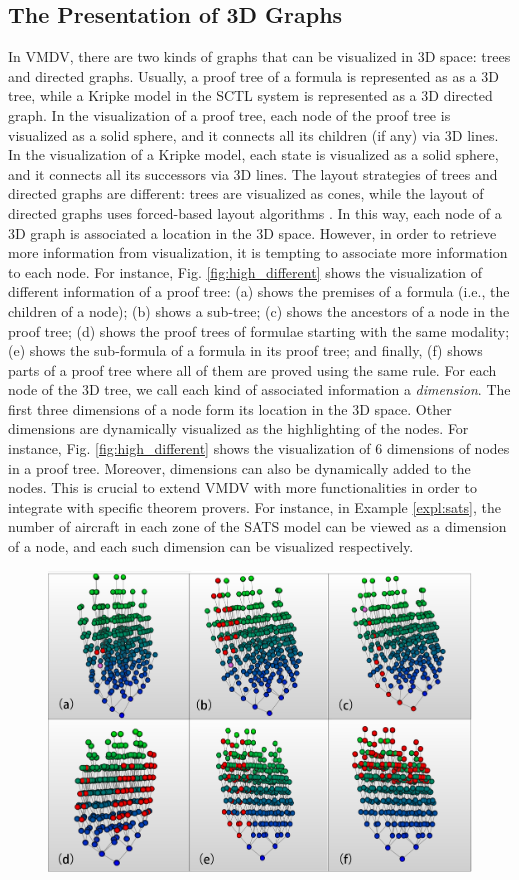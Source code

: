 \documentclass[runningheads]{llncs}
\newcommand\tool[1]{\textsf{#1}}
\begin{document}
{\color{red}

\subsection{\bf The Presentation of 3D Graphs}
In \tool{VMDV}, there are two kinds of graphs that can be visualized in 3D space: trees and directed graphs. Usually, a proof tree of a formula is represented as as a 3D tree, while a Kripke model in the \textsf{SCTL} system is represented as a 3D directed graph.
In the visualization of a proof tree, each node of the proof tree is visualized as a solid sphere, and it connects all its children (if any) via 3D lines. In the visualization of a Kripke model, each state is visualized as a solid sphere, and it connects all its successors via 3D lines. The layout strategies of trees and directed graphs are different: trees are visualized as cones, while the layout of directed graphs uses forced-based layout algorithms \cite{jacomy2014forceatlas2,yifanhu05}.
In this way, each node of a 3D graph is associated a location in the 3D space.
However, in order to retrieve more information from visualization, it is tempting to associate more information to each node. 
For instance, Fig. \ref{fig:high_different} shows the visualization of different information of a proof tree: (a) shows the premises of a formula (i.e., the children of a node); (b) shows a sub-tree; (c) shows the ancestors of a node in the proof tree; (d) shows the proof trees of formulae starting with the same modality; (e) shows the sub-formula of a formula in its proof tree; and finally, (f) shows parts of a proof tree where all of them are proved using the same rule. For each node of the 3D tree, we call each kind of associated information a {\it dimension}. The first three dimensions of a node form its location in the 3D space. Other dimensions are dynamically visualized as the highlighting of the nodes. For instance, Fig. \ref{fig:high_different} shows the visualization of 6 dimensions of nodes in a proof tree. Moreover, dimensions can also be dynamically added to the nodes. This is crucial to extend \tool{VMDV} with more functionalities in order to integrate with specific theorem provers. For instance, in Example \ref{expl:sats}, the number of aircraft in each zone of the SATS model can be viewed as a dimension of a node, and each such dimension can be visualized respectively. 
\begin{figure}[h!]
	\centering
	\includegraphics[width=12cm]{./high_different2.png}

\end{figure}}
\end{document}
